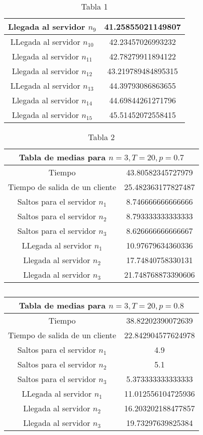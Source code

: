 \documentclass{article}
\begin{document}
\begin{table}[h]
\begin{tabular}{|c|c|}
\hline
Llegada al servidor $n_9$ & 41.25855021149807\\
\hline
LLegada al servidor $n_10$ & 42.23457026993232\\
\hline
Llegada al servidor $n_11$ & 42.78279911894122\\
\hline
Llegada al servidor $n_12$ & 43.219789484895315\\
\hline
LLegada al servidor $n_13$ & 44.39793086863655\\
\hline
Llegada al servidor $n_14$ & 44.69844261271796\\
\hline
Llegada al servidor $n_15$ & 45.51452072558415\\
\hline
\end{tabular}
\caption{Tabla 1}
\end{table}


\begin{table}[h]
\centering
\begin{tabular}{|c|c|}
\hline
\multicolumn{2}{|c|}{\textbf{Tabla de medias para $n=3,T=20,p=0.7$}} \\
\hline
Tiempo & 43.80582345727979\\
\hline
Tiempo de salida de un cliente & 25.482363177827487\\
\hline
Saltos para el servidor $n_1$ & 8.746666666666666\\
\hline
Saltos para el servidor $n_2$ & 8.793333333333333\\
\hline
Saltos para el servidor $n_3$ & 8.626666666666667\\
\hline
LLegada al servidor $n_1$ & 10.97679634360336\\
\hline
Llegada al servidor $n_2$ & 17.74840758330131\\
\hline
Llegada al servidor $n_3$ & 21.748768873390606\\
\hline
\end{tabular}
\caption{Tabla 2}
\end{table}

\begin{table}[h]
\centering
\begin{tabular}{|c|c|}
\hline
\multicolumn{2}{|c|}{\textbf{Tabla de medias para $n=3,T=20,p=0.8$}} \\
\hline
Tiempo & 38.82202390072639\\
\hline
Tiempo de salida de un cliente & 22.842904577624978\\
\hline
Saltos para el servidor $n_1$ & 4.9\\
\hline
Saltos para el servidor $n_2$ & 5.1\\
\hline
Saltos para el servidor $n_3$ & 5.373333333333333\\
\hline
LLegada al servidor $n_1$ & 11.012556104725936\\
\hline
Llegada al servidor $n_2$ & 16.203202188477857\\
\hline
Llegada al servidor $n_3$ & 19.73297639825384\\
\hline
\end{tabular}
\caption{}
\end{table}
\end{document}
